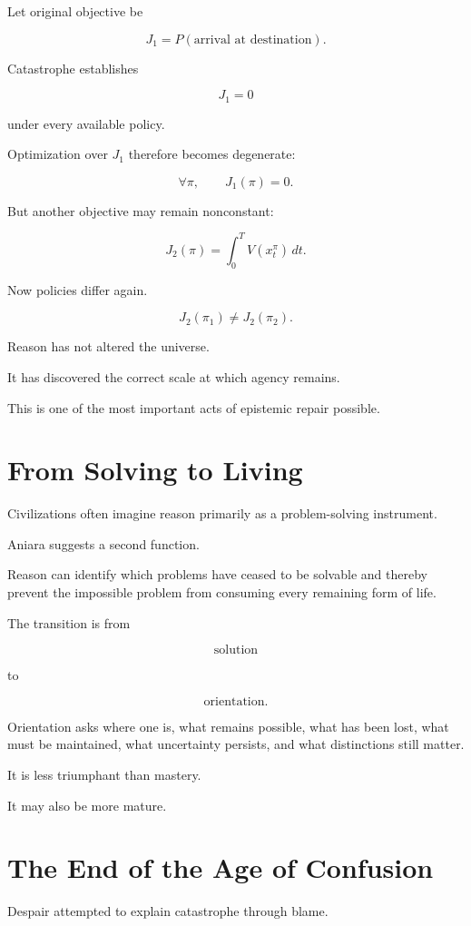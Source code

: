 \documentclass[11pt,oneside]{book}
\theoremstyle{definition}
\theoremstyle{remark}
\begin{document}
Let original objective be

\[
J_1
=
P(\text{arrival at destination}).
\]

Catastrophe establishes

\[
J_1=0
\]

under every available policy.

Optimization over \(J_1\) therefore becomes degenerate:

\[
\forall\pi,\qquad J_1(\pi)=0.
\]

But another objective may remain nonconstant:

\[
J_2(\pi)
=
\int_0^T
V(x_t^\pi)\,dt.
\]

Now policies differ again.

\[
J_2(\pi_1)\neq J_2(\pi_2).
\]

Reason has not altered the universe.

It has discovered the correct scale at which agency remains.

This is one of the most important acts of epistemic repair possible.

\section{From Solving to Living}

Civilizations often imagine reason primarily as a problem-solving instrument.

Aniara suggests a second function.

Reason can identify which problems have ceased to be solvable and thereby prevent the impossible problem from consuming every remaining form of life.

The transition is from

\[
\text{solution}
\]

to

\[
\text{orientation}.
\]

Orientation asks where one is, what remains possible, what has been lost, what must be maintained, what uncertainty persists, and what distinctions still matter.

It is less triumphant than mastery.

It may also be more mature.

\section{The End of the Age of Confusion}

Despair attempted to explain catastrophe through blame.
\end{document}
